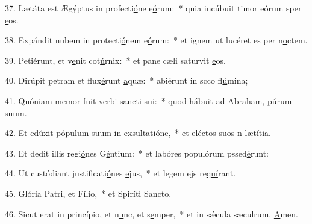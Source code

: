 37. Lætáta est Ægýptus in profecti\uline{ó}ne e\uline{ó}rum:~* quia incúbuit timor eórum sper \uline{e}os.\par 
38. Expándit nubem in protecti\uline{ó}nem e\uline{ó}rum:~* et ignem ut lucéret es per n\uline{o}ctem.\par 
39. Petiérunt, et v\uline{e}nit cot\uline{ú}rnix:~* et pane cæli saturvit \uline{e}os.\par 
40. Dirúpit petram et flux\uline{é}runt \uline{a}quæ:~* abiérunt in scco fl\uline{ú}mina;\par 
41. Quóniam memor fuit verbi s\uline{a}ncti s\uline{u}i:~* quod hábuit ad Abraham, púrum s\uline{u}um.\par 
42. Et edúxit pópulum suum in exsult\uline{a}ti\uline{ó}ne,~* et eléctos suos n læt\uline{í}tia.\par 
43. Et dedit illis regi\uline{ó}nes G\uline{é}ntium:~* et labóres populórum pssed\uline{é}runt:\par 
44. Ut custódiant justificati\uline{ó}nes \uline{e}jus,~* et legem ejs re\uline{quí}rant.\par 
45. Glória P\uline{a}tri, et F\uline{í}lio,~* et Spiríti S\uline{a}ncto.\par 
46. Sicut erat in princípio, et n\uline{u}nc, et s\uline{e}mper,~* et in sǽcula sæculrum. \uline{A}men.\par 
